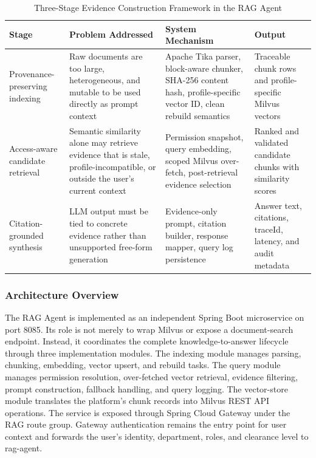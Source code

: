 \begin{table}[H]
\small\singlespacing
\centering
\caption{Three-Stage Evidence Construction Framework in the RAG Agent}
\label{tab:rag-evidence-framework}
\vspace{2mm}

\begin{tabularx}{\textwidth}{>{\RaggedRight\arraybackslash}p{}>{\RaggedRight\arraybackslash}p{}>{\RaggedRight\arraybackslash}p{}>{\RaggedRight\arraybackslash}X}
\toprule
\textbf{Stage} & \textbf{Problem Addressed} & \textbf{System Mechanism} & \textbf{Output} \\
\midrule
Provenance-preserving indexing & Raw documents are too large, heterogeneous, and mutable to be used directly as prompt context & Apache Tika parser, block-aware chunker, SHA-256 content hash, profile-specific vector ID, clean rebuild semantics & Traceable chunk rows and profile-specific Milvus vectors \\
Access-aware candidate retrieval & Semantic similarity alone may retrieve evidence that is stale, profile-incompatible, or outside the user's current context & Permission snapshot, query embedding, scoped Milvus over-fetch, post-retrieval evidence selection & Ranked and validated candidate chunks with similarity scores \\
Citation-grounded synthesis & LLM output must be tied to concrete evidence rather than unsupported free-form generation & Evidence-only prompt, citation builder, response mapper, query log persistence & Answer text, citations, traceId, latency, and audit metadata \\
\bottomrule
\end{tabularx}
\end{table}

\subsubsection{Architecture Overview}

The RAG Agent is implemented as an independent Spring Boot microservice on port 8085. Its role is not merely to wrap Milvus or expose a document-search endpoint. Instead, it coordinates the complete knowledge-to-answer lifecycle through three implementation modules. The indexing module manages parsing, chunking, embedding, vector upsert, and rebuild tasks. The query module manages permission resolution, over-fetched vector retrieval, evidence filtering, prompt construction, fallback handling, and query logging. The vector-store module translates the platform's chunk records into Milvus REST API operations. The service is exposed through Spring Cloud Gateway under the RAG route group. Gateway authentication remains the entry point for user context and forwards the user's identity, department, roles, and clearance level to rag-agent.

